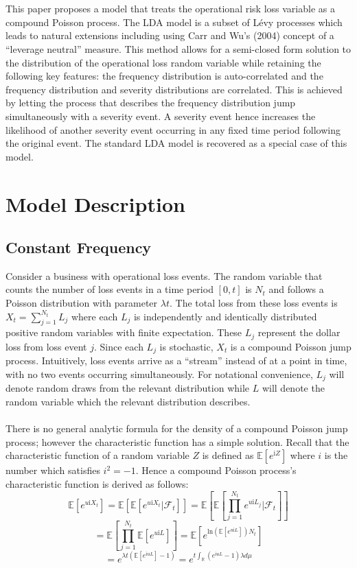 \documentclass{article}
\theoremstyle{definition}
\begin{document}
\\
\\
This paper proposes a model that treats the operational risk loss variable as a compound Poisson process. The LDA model is a subset of L\'evy processes which leads to natural extensions including using Carr and Wu's (2004) concept of a ``leverage neutral'' measure.  This method allows for a semi-closed form solution to the distribution of the operational loss random variable while retaining the following key features: the frequency distribution is auto-correlated and the frequency distribution and severity distributions are correlated.  This is achieved by letting the process that describes the frequency distribution jump simultaneously with a severity event.  A severity event hence increases the likelihood of another severity event occurring in any fixed time period following the original event. The standard LDA model is recovered as a special case of this model.

\section{Model Description}
\subsection{Constant Frequency}
Consider a business with operational loss events.  The random variable that counts the number of loss events in a time period \([0, t]\) is \(N_t\) and follows a Poisson distribution with parameter \(\lambda t\).  The total loss from these loss events is \(X_t=\sum_{j=1} ^ {N_t} L_j\) where each \(L_j\) is independently and identically distributed positive random variables with finite expectation.  These \(L_j\) represent the dollar loss from loss event \(j\).  Since each \(L_j\) is stochastic, \(X_t\) is a compound Poisson jump process.  Intuitively, loss events arrive as a ``stream'' instead of at a point in time, with no two events occurring simultaneously.  For notational convenience, \(L_j\) will denote random draws from the relevant distribution while \(L\) will denote the random variable which the relevant distribution describes.  
\\
\\
There is no general analytic formula for the density of a compound Poisson jump process; however the characteristic function has a simple solution.  Recall that the characteristic function of a random variable \(Z\) is defined as \(\mathbb{E}[e^{\mathrm{i}Z}]\) where \(i\) is the number which satisfies \(i^2=-1\).  Hence a compound Poisson process's characteristic function is derived as follows: 
\[\mathbb{E}[e^{u\mathrm{i}X_t}]=\mathbb{E}\left[\mathbb{E}[e^{u\mathrm{i}X_t}|\mathcal{F}_t]\right]=\mathbb{E}\left[\mathbb{E}\left[\prod_{j=1} ^ {N_t} e^{u\mathrm{i} L_j}|\mathcal{F}_t\right]\right]\]
\[=\mathbb{E}\left[\prod_{j=1} ^ {N_t} \mathbb{E}[e^{u\mathrm{i}L}] \right]=\mathbb{E}\left[e^{\mathrm{ln}\left(\mathbb{E}[e^{u\mathrm{i}L}]\right) N_t}\right]\]
\[=e^{\lambda t \left(\mathbb{E}\left[ e^{\mathrm{i}uL}\right]-1\right)}=e^{t \int_{\mathbb{R}} (e^{\mathrm{i}uL}-1) \lambda d\mu}\]
\end{document}
